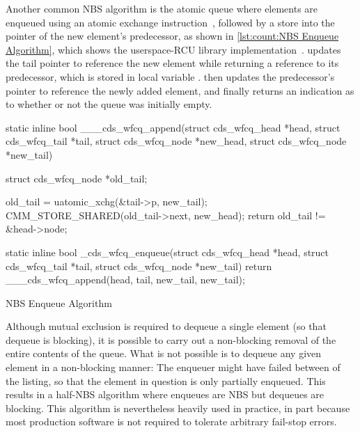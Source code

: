 \begin{fcvref}
Another common NBS algorithm is the atomic queue where elements are
enqueued using an atomic exchange instruction~\cite{MagedMichael1993JPDC},
followed by a store into the  pointer of the new element's
predecessor, as shown in \cref{lst:count:NBS Enqueue Algorithm},
which shows the userspace-RCU library
implementation~\cite{MathieuDesnoyers2009URCU}.
 updates the tail pointer to reference the new element while
returning a reference to its predecessor, which is stored in
local variable .
 then updates the predecessor's  pointer to
reference the newly added element, and finally 
returns an indication as to whether or not the queue was initially
empty.

\begin{listing}
\begin{fcvlabel}
\begin{VerbatimL}[commandchars=\\\[\]]
static inline bool
___cds_wfcq_append(struct cds_wfcq_head *head,
                   struct cds_wfcq_tail *tail,
                   struct cds_wfcq_node *new_head,
                   struct cds_wfcq_node *new_tail)
{
	struct cds_wfcq_node *old_tail;

	old_tail = uatomic_xchg(&tail->p, new_tail);	\lnlbl[tail]
	CMM_STORE_SHARED(old_tail->next, new_head);     \lnlbl[pred]
	return old_tail != &head->node;			\lnlbl[ret]
}

static inline bool
_cds_wfcq_enqueue(struct cds_wfcq_head *head,
                  struct cds_wfcq_tail *tail,
                  struct cds_wfcq_node *new_tail)
{
	return ___cds_wfcq_append(head, tail,
	                          new_tail, new_tail);
}
\end{VerbatimL}
\end{fcvlabel}
\caption{NBS Enqueue Algorithm}
\label{lst:count:NBS Enqueue Algorithm}
\end{listing}

Although mutual exclusion is required to dequeue a single element
(so that dequeue is blocking), it is possible to carry out a non-blocking
removal of the entire contents of the queue.
What is not possible is to dequeue any given element in a non-blocking
manner:
The enqueuer might have failed between  of the
listing, so that the element in question is only partially enqueued.
This results in a half-NBS algorithm where enqueues are NBS but
dequeues are blocking.
This algorithm is nevertheless heavily used in practice, in part because
most production software is not required to tolerate arbitrary fail-stop
errors.
\end{fcvref}

